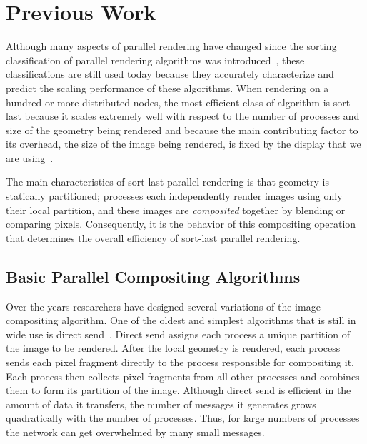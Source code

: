 \documentclass{acm_proc_article-sp}
\newcommand*{\lcite}[1]{~\cite{#1}}
\newcommand*{\keyterm}[1]{\emph{#1}}
\begin{document}
\section{Previous Work}
\label{sec:PreviousWork}

Although many aspects of parallel rendering have changed since the sorting
classification of parallel rendering algorithms was
introduced\lcite{Molnar1994}, these classifications are still used today
because they accurately characterize and predict the scaling performance of
these algorithms.  When rendering on a hundred or more distributed nodes,
the most efficient class of algorithm is sort-last because it scales
extremely well with respect to the number of processes and size of the
geometry being rendered and because the main contributing factor to its
overhead, the size of the image being rendered, is fixed by the display
that we are using\lcite{Wylie2001}.

The main characteristics of sort-last parallel rendering is that geometry
is statically partitioned; processes each independently render images using
only their local partition, and these images are \keyterm{composited}
together by blending or comparing pixels.  Consequently, it is the behavior
of this compositing operation that determines the overall efficiency of
sort-last parallel rendering.

\subsection{Basic Parallel Compositing Algorithms}
\label{sec:BasicParallelCompositingAlgorithms}

Over the years researchers have designed several variations of the image
compositing algorithm.  One of the oldest and simplest algorithms that is
still in wide use is direct send\lcite{DirectSend1,DirectSend2}.  Direct
send assigns each process a unique partition of the image to be rendered.
After the local geometry is rendered, each process sends each pixel
fragment directly to the process responsible for compositing it.  Each
process then collects pixel fragments from all other processes and combines
them to form its partition of the image.  Although direct send is efficient
in the amount of data it transfers, the number of messages it generates
grows quadratically with the number of processes.  Thus, for large numbers
of processes the network can get overwhelmed by many small messages.
\end{document}
